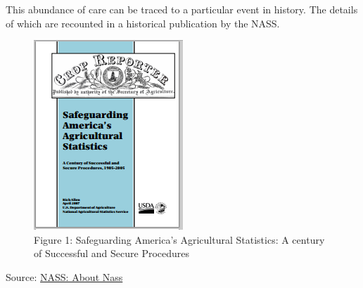 \documentclass[]{book}
\theoremstyle{definition}
\theoremstyle{definition}
\theoremstyle{remark}
\begin{document}
This abundance of care can be traced to a particular event in history.
The details of which are recounted in a historical publication by the
NASS.

\begin{figure}[htbp]
\centering
\includegraphics{images/NASS_History.png}
\caption{Figure 1: Safeguarding America's Agricultural Statistics: A
century of Successful and Secure Procedures}
\end{figure}

Source:
\href{pdf-readings/safegaurding-americas-agricultural-statistics.pdf}{NASS:
About Nass}
\end{document}
